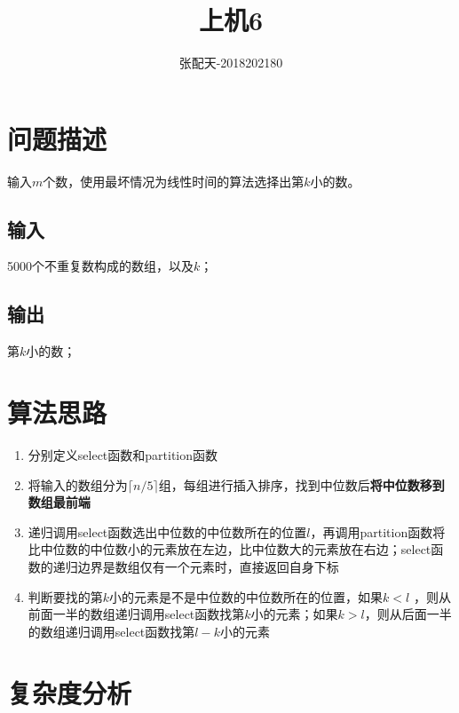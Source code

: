 \documentclass{ctexart}[UTF8]
\author{张配天-2018202180}
\title{上机6}
\begin{document}
    \maketitle
    \tableofcontents
    \clearpage
    \section{问题描述}
    输入$m$个数，使用最坏情况为线性时间的算法选择出第$k$小的数。
    \subsection{输入}
    5000个不重复数构成的数组，以及$k$；
    \subsection{输出}
    第$k$小的数；
    \section{算法思路}
    \begin{enumerate}
        \item 分别定义select函数和partition函数
        \item 将输入的数组分为$\lceil n/5 \rceil$组，每组进行插入排序，找到中位数后\textbf{将中位数移到数组最前端}
        \item 递归调用select函数选出中位数的中位数所在的位置$l$，再调用partition函数将比中位数的中位数小的元素放在左边，比中位数大的元素放在右边；select函数的递归边界是数组仅有一个元素时，直接返回自身下标
        \item 判断要找的第$k$小的元素是不是中位数的中位数所在的位置，如果$k<l$ ，则从前面一半的数组递归调用select函数找第$k$小的元素；如果$k>l$，则从后面一半的数组递归调用select函数找第$l-k$小的元素    
    \end{enumerate}
    \section{复杂度分析}
\end{document}
